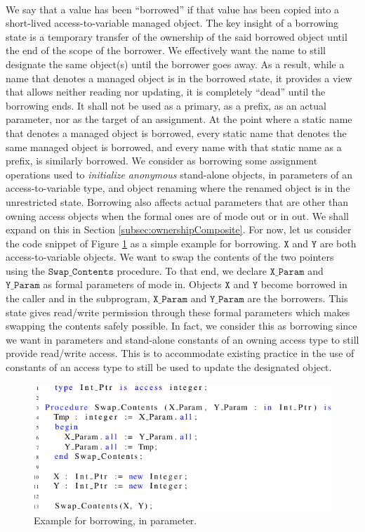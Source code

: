 \documentclass{llncs}
\newcommand\var[1]{\ensuremath{\mathtt{#1}}}
\newcommand{\keyword}[1]{\textsf{#1}}
\begin{document}
\ \\
We say that a value has been ``borrowed'' if that value has been copied into a short-lived access-to-variable managed object.
The key insight of a borrowing state is a temporary transfer of the ownership of the said borrowed object until the end of the scope of the borrower.
We effectively want the name to still designate the same object(s) until the borrower goes away. As a result, while a name that denotes a managed object
is in the borrowed state, it provides a view that allows neither reading nor updating, it is completely ``dead'' until the borrowing ends. It shall not
be used as a primary, as a prefix, as an actual parameter, nor as the target of an assignment. At the point where a static name that denotes a managed
object is borrowed, every static name that denotes the same managed object is borrowed, and every name with that static name as a prefix, is similarly borrowed.
We consider as borrowing some assignment operations used to \textit{initialize anonymous} stand-alone objects, \keyword{in} parameters of an access-to-variable
type, and object renaming where the renamed object is in the unrestricted state. Borrowing also affects actual parameters that are other than owning access objects
when the formal ones are of mode \keyword{out} or \keyword{in out}. We shall expand on this in Section \ref{subsec:ownershipComposite}. For now, let us consider the
code snippet of Figure \ref{fig:borrow_ex1} as a simple example for borrowing. \var{X} and \var{Y} are both access-to-variable objects. We want to swap the contents of the two
pointers using the \var{Swap\_Contents} procedure. To that end, we declare \var{X\_Param} and \var{Y\_Param} as formal parameters of mode \keyword{in}. Objects \var{X} and \var{Y} become borrowed
in the caller and in the subprogram, \var{X\_Param} and \var{Y\_Param} are the borrowers. This state gives read/write permission through these formal parameters which makes swapping
the contents safely possible. In fact, we consider this as borrowing since we want \keyword{in} parameters and stand-alone constants of an owning access type to still
provide read/write access. This is to accommodate existing practice in the use of constants of an access type to still be used to update the designated object.

\begin{figure}[htb!]
\centering
   \includegraphics[]{borrow_ex1}
   \caption{Example for borrowing, \keyword{in} parameter.}
   \label{fig:borrow_ex1}
\end{figure}
\end{document}
